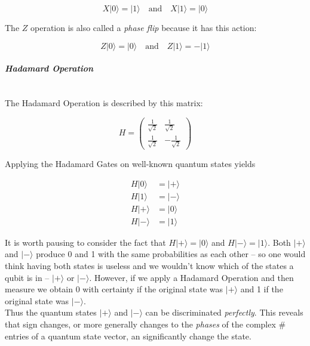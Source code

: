 \documentclass[svgnames]{article}     %
\begin{document}
 \[
X|0\rangle = |1\rangle \quad \text{and} \quad X|1\rangle = |0\rangle
\] \vspace{5px}

The $Z$ operation is also called a \textit{phase flip} because it has this
action: 

\[
Z|0\rangle = |0\rangle \quad \text{and} \quad Z|1\rangle = -|1\rangle
\] \vspace{5px}

\paragraph{\textit{Hadamard Operation}} \mbox{} \\ 

The Hadamard Operation is described by this matrix: 

\[
H = \begin{pmatrix}
  \frac{1}{\sqrt{2}} & \frac{1}{\sqrt{2}} \\[4px]
  \frac{1}{\sqrt{2}} & -\frac{1}{\sqrt{2}} 
\end{pmatrix}
\] \vspace{5px}

Applying the Hadamard Gates on well-known quantum states yields 

\begin{align*}
  H|0\rangle &= |+\rangle \\
  H|1\rangle &= |-\rangle \\
  H|+\rangle &= |0\rangle \\
  H|-\rangle &= |1\rangle
\end{align*}

It is worth pausing to consider the fact that $H|+\rangle = |0\rangle$ and
$H|-\rangle = |1\rangle$. Both  $|+\rangle$ and  $|-\rangle$ produce
0 and 1 with the same probabilities as each other -- so one would think having
both states is useless and we wouldn't know which of the states a qubit is in 
-- $|+\rangle$ or $|-\rangle$. However, if we apply a Hadamard Operation and
then measure we obtain 0 with certainty if the original state was $|+\rangle$ 
and 1 if the original state was $|-\rangle$. \\ 

  Thus the quantum states $|+\rangle$ and $|-\rangle$ can be discriminated
  \textit{perfectly}. This reveals that sign changes, or more generally changes
  to the \textit{phases} of the complex \# entries of a quantum state vector,
  an significantly change the state.\\
\end{document}
